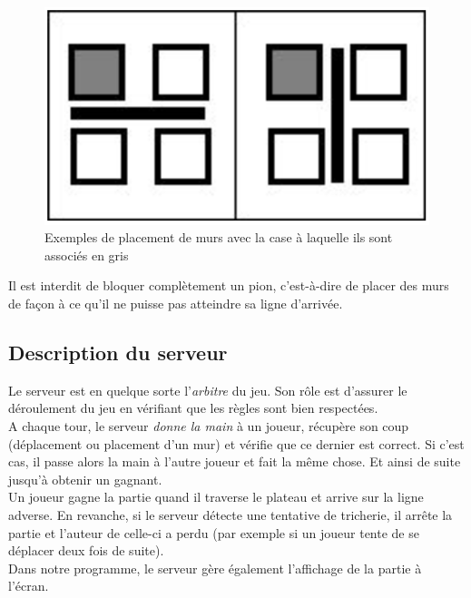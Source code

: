 \documentclass[12pt,a4paper]{article}
\begin{document}
\begin{figure}[h]
  \begin{center}
    \includegraphics[scale=0.22]{wallplacement}
    \caption{Exemples de placement de murs avec la case à laquelle ils
    sont associés en gris}
    \label{wallplacement}
  \end{center}
\end{figure}

Il est interdit de bloquer complètement un pion, c'est-à-dire de placer des murs de façon à
ce qu'il ne puisse pas atteindre sa ligne d'arrivée.

\subsection{Description du serveur}

Le serveur est en quelque sorte l'\textit{arbitre} du jeu. Son r\^ole est 
d'assurer le déroulement du jeu en vérifiant que les règles sont bien 
respectées.\\

A chaque tour, le serveur \textit{donne la main} à un joueur, récupère son coup  
(déplacement ou placement d'un mur) et vérifie que ce dernier est correct. Si 
c'est cas, il passe alors la main à l'autre joueur et fait la m\^eme chose.
Et ainsi de suite jusqu'à obtenir un gagnant.\\

Un joueur gagne la partie quand il \og traverse \fg{} le plateau et arrive sur la ligne 
adverse. En revanche, si le serveur détecte une tentative de tricherie, il arr\^ete la 
partie et l'auteur de celle-ci a perdu (par exemple si un joueur tente de se déplacer 
deux fois de suite).
\\

Dans notre programme, le serveur gère également l'affichage de la partie à 
l'écran.\\
\end{document}
